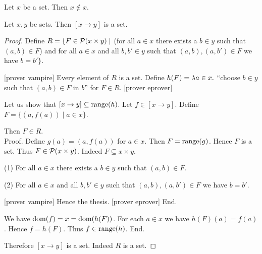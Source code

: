 \documentclass[10pt]{article}
\begin{document}
  \begin{forthel}
    \begin{corollary}
      Let $x$ be a set.
      Then $x \notin x$.
    \end{corollary}
  \end{forthel}

  \begin{forthel}
    \begin{proposition}
      Let $x, y$ be sets.
      Then $[x \to y]$ is a set.
    \end{proposition}
    \begin{proof}
      Define $R = \{ F \in \mathcal{P}(x \times y) \mid$ (for all $a \in x$ there
      exists a $b \in y$ such that $(a,b) \in F$) and for all $a \in x$ and
      all $b, b' \in y$ such that $(a,b), (a,b') \in F$ we have $b = b' \}$.

      [prover vampire]
      Every element of $R$ is a set. %
      Define $h(F) = \mathrm{\lambda} a \in x.$ ``choose $b \in y$ such that
      $(a,b) \in F$ in $b$'' for $F \in R$.
      [prover eprover]

      Let us show that $[x \to y] \subseteq \textrm{range}(h)$.
        Let $f \in [x \to y]$.
        Define $F = \{ (a,f(a)) \mid a \in x \}$.

        Then $F \in R$. \\
        Proof.
          Define $g(a) = (a,f(a))$ for $a \in x$.
          Then $F = \textrm{range}(g)$.
          Hence $F$ is a set.
          Thus $F \in \mathcal{P}(x \times y)$.
          Indeed $F \subseteq x \times y$.

          (1) For all $a \in x$ there exists a $b \in y$ such that $(a,b) \in F$.

          (2) For all $a \in x$ and all $b, b' \in y$ such that $(a,b),
          (a,b') \in F$ we have $b = b'$.

          [prover vampire]
          Hence the thesis.
          [prover eprover]
        End.

        We have $\operatorname{dom}(f) = x = \operatorname{dom}(h(F))$.
        For each $a \in x$ we have $h(F)(a) = f(a)$.
        Hence $f = h(F)$.
        Thus $f \in \textrm{range}(h)$.
      End.

      Therefore $[x \to y]$ is a set.
      Indeed $R$ is a set.
    \end{proof}
  \end{forthel}
\end{document}
